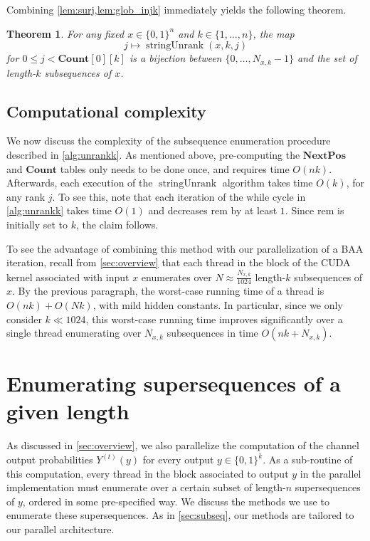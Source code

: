 \documentclass[11pt]{article}
\newcommand{\NextPos}{\mathbf{NextPos}}
\newcommand{\Cnt}{\mathbf{Count}}
\newcommand{\rem}{\mathrm{rem}}
\newcommand{\unrankk}{\operatorname{stringUnrank}}
\newtheorem{theorem}{Theorem}
\newcommand{\bits}{\{0,1\}}
\begin{document}
Combining \cref{lem:surj,lem:glob_injk} immediately yields the following theorem.
\begin{theorem}
For any fixed $x\in\bits^n$ and $k\in\{1,\dots,n\}$, the map
\[
j \mapsto \unrankk(x,k,j)
\]
for $0\le j<\Cnt[0][k]$
is a bijection between $\{0,\dots,N_{x,k}-1\}$ and the set of length-$k$ subsequences of $x$.
\end{theorem}




\subsection{Computational complexity}

We now discuss the complexity of the subsequence enumeration procedure described in \cref{alg:unrankk}.
As mentioned above, pre-computing the $\NextPos$ and $\Cnt$ tables only needs to be done once, and requires time $O(nk)$.
Afterwards, each execution of the $\unrankk$ algorithm takes time $O(k)$, for any rank $j$.
To see this, note that each iteration of the while cycle in \cref{alg:unrankk} takes time $O(1)$ and decreases $\rem$ by at least $1$.
Since $\rem$ is initially set to $k$, the claim follows.

To see the advantage of combining this method with our parallelization of a BAA iteration, recall from \cref{sec:overview} that each thread in the block of the CUDA kernel associated with input $x$ enumerates over $N\approx \frac{N_{x,k}}{1024}$ length-$k$ subsequences of $x$.
By the previous paragraph, the worst-case running time of a thread is $O(nk) + O(Nk)$, with mild hidden constants.
In particular, since we only consider $k\ll 1024$, this worst-case running time improves significantly over a single thread enumerating over $N_{x,k}$ subsequences in time $O(nk+N_{x,k})$.











\section{Enumerating supersequences of a given length}
\label{sec:superseq}

As discussed in \cref{sec:overview}, we also parallelize the computation of the channel output probabilities $Y^{(t)}(y)$ for every output $y\in\bits^k$.
As a sub-routine of this computation, every thread in the block associated to output $y$ in the parallel implementation must enumerate over a certain subset of length-$n$ supersequences of $y$, ordered in some pre-specified way.
We discuss the methods we use to enumerate these supersequences.
As in \cref{sec:subseq}, our methods are tailored to our parallel architecture.
\end{document}
